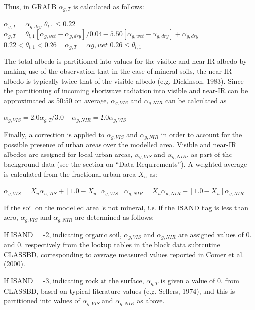 Thus, in G\+R\+A\+L\+B $\alpha_{g,T}$ is calculated as follows\+:

$\alpha_{g,T} = \alpha_{g,dry}$ $\theta_{l,1} \leq 0.22 $ ~\newline
 $\alpha_{g,T} = \theta_{l,1} [\alpha_{g,wet} - \alpha_{g,dry} ]/0.04 - 5.50 [\alpha_{g,wet} - \alpha_{g,dry} ] + \alpha_{g,dry} $ $0.22 < \theta_{l,1} < 0.26 $ ~\newline
 $\alpha_{g,T} = \alpha{g,wet} $ $ 0.26 \leq \theta_{l,1}$

The total albedo is partitioned into values for the visible and near-\/\+I\+R albedo by making use of the observation that in the case of mineral soils, the near-\/\+I\+R albedo is typically twice that of the visible albedo (e.\+g. Dickinson, 1983). Since the partitioning of incoming shortwave radiation into visible and near-\/\+I\+R can be approximated as 50\+:50 on average, $\alpha_{g,VIS}$ and $\alpha_{g,NIR}$ can be calculated as

$\alpha_{g,VIS} = 2.0 \alpha_{g,T} /3.0$ ~\newline
 $\alpha_{g,NIR} = 2.0 \alpha_{g,VIS}$

Finally, a correction is applied to $\alpha_{g,VIS}$ and $\alpha_{g,NIR}$ in order to account for the possible presence of urban areas over the modelled area. Visible and near-\/\+I\+R albedos are assigned for local urban areas, $\alpha_{g,VIS}$ and $\alpha_{g,NIR}$, as part of the background data (see the section on “\+Data Requirements”). A weighted average is calculated from the fractional urban area $X_u$ as\+:

$\alpha_{g,VIS} = X_u \alpha_{u,VIS} + [1.0-X_u ] \alpha_{g,VIS}$~\newline
 $\alpha_{g,NIR} = X_u \alpha_{u,NIR} + [1.0-X_u ] \alpha_{g,NIR}$

If the soil on the modelled area is not mineral, i.\+e. if the I\+S\+A\+N\+D flag is less than zero, $\alpha_{g,VIS}$ and $\alpha_{g,NIR}$ are determined as follows\+:

If I\+S\+A\+N\+D = -\/2, indicating organic soil, $\alpha_{g,VIS}$ and $\alpha_{g,NIR}$ are assigned values of 0. and 0. respectively from the lookup tables in the block data subroutine C\+L\+A\+S\+S\+B\+D, corresponding to average measured values reported in Comer et al. (2000).

If I\+S\+A\+N\+D = -\/3, indicating rock at the surface, $\alpha_{g,T}$ is given a value of 0. from C\+L\+A\+S\+S\+B\+D, based on typical literature values (e.\+g. Sellers, 1974), and this is partitioned into values of $\alpha_{g,VIS}$ and $\alpha_{g,NIR}$ as above.

